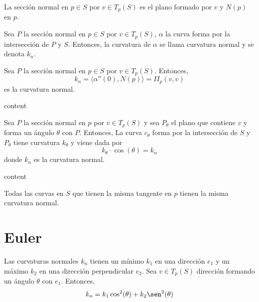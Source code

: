 \begin{defn}
  La sección normal en $p \in S$ por $v \in T_{p}(S)$ es el plano formado por $v$ y $N(p)$ en $p$.
\end{defn}

\begin{defn}
  Sea $P$ la sección normal en $p \in S$ por $v \in T_{p}(S)$, $\alpha$ la curva forma por la intersección de $P$ y $S$. Entonces, la curvatura de $\alpha$ se llama curvatura normal y se denota $k_{n}$.
\end{defn}

\begin{prop}
  Sea $P$ la sección normal en $p \in S$ por $v \in T_{p}(S)$. Entonces,
  \[ 
    k_{n} = \langle \alpha''(0){ , }N(p) \rangle = II_{p}(v, v)
  \] 
  es la curvatura normal.
\end{prop}

\begin{dem}
  content
\end{dem}

\begin{theo}[Meusnier]
  Sea $P$ la sección normal en $p$ por $v \in T_{p}(S)$ y sea $P_{\theta}$ el plano que contiene $v$ y forma un ángulo $\theta$ con $P$. Entonces, La curva $c_{\theta}$ forma por la intersección de $S$ y $P_{\theta}$ tiene curvatura $k_{\theta}$ y viene dada por
  \[ 
    k_{\theta} \cdot \cos(\theta) = k_{n} 
  \] 
  donde $k_{n}$ es la curvatura normal.
\end{theo}

\begin{dem}
  content
\end{dem}

\begin{prop}
  Todas las curvas en $S$ que tienen la misma tangente en $p$ tienen la misma curvatura normal.
\end{prop}

\section{Euler}

\begin{theo}[Euler]
  Las curvaturas normales $k_{n}$ tienen un mínimo $k_{1}$ en una dirección $e_{1}$ y un máximo $k_{2}$ en una dirección perpendicular $e_{2}$. Sea $v \in T_{p}(S)$ dirección formando un ángulo $\theta$ con $e_{1}$. Entonces,
  \[ 
    k_{n} = k_{1} \cos^{2}(\theta) + k_{2} \sen^{2}(\theta)
  \] 
\end{theo}

